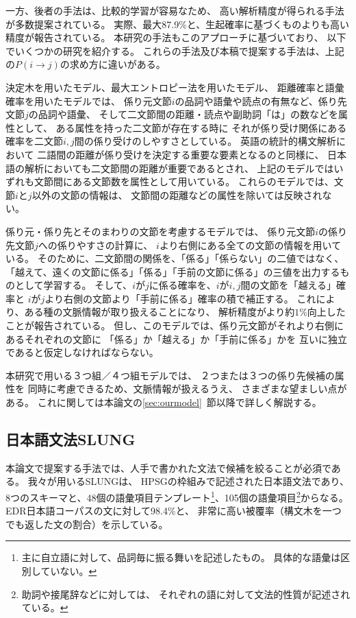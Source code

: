一方、後者の手法は、比較的学習が容易なため、
高い解析精度が得られる手法が多数提案されている。
実際、最大87.9$\%$と、生起確率に基づくものよりも高い精度が報告されている\cite{Uchimoto99b}。
本研究の手法もこのアプローチに基づいており、
以下でいくつかの研究を紹介する。
これらの手法及び本稿で提案する手法は、上記の$P(i \rightarrow j)$の求め方に違いがある。


決定木を用いたモデル\cite{Haruno98}、最大エントロピー法を用いたモデル\cite{Uchimoto99}、
距離確率と語彙確率を用いたモデル\cite{Fujio99}では、
係り元文節$i$の品詞や語彙や読点の有無など、係り先文節$j$の品詞や語彙、
そして二文節間の距離・読点や副助詞「は」の数などを属性として、
ある属性を持った二文節が存在する時に
それが係り受け関係にある確率を二文節$i, j$間の係り受けのしやすさとしている。
英語の統計的構文解析において
二語間の距離が係り受けを決定する重要な要素となる\cite{Collins96}のと同様に、
日本語の解析においても二文節間の距離が重要であるとされ、
上記のモデルではいずれも文節間にある文節数を属性として用いている。
これらのモデルでは、文節$i$と$j$以外の文節の情報は、
文節間の距離などの属性を除いては反映されない。


係り元・係り先とそのまわりの文節を考慮するモデル\cite{Uchimoto99b}では、
係り元文節$i$の係り先文節$j$への係りやすさの計算に、
$i$より右側にある全ての文節の情報を用いている。
そのために、二文節間の関係を、「係る」「係らない」の二値ではなく、
「越えて、遠くの文節に係る」「係る」「手前の文節に係る」の三値を出力するものとして学習する。
そして、$i$が$j$に係る確率を、$i$が$i, j$間の文節を「越える」確率と
$i$が$j$より右側の文節より「手前に係る」確率の積で補正する。
これにより、ある種の文脈情報が取り扱えることになり、
解析精度が\cite{Uchimoto99}より約$1\%$向上したことが報告されている。
但し、このモデルでは、係り元文節がそれより右側にあるそれぞれの文節に
「係る」か「越える」か「手前に係る」かを
互いに独立であると仮定しなければならない。


本研究で用いる３つ組／４つ組モデル\cite{Kanayama99}では、
２つまたは３つの係り先候補の属性を
同時に考慮できるため、文脈情報が扱えるうえ、
さまざまな望ましい点がある。
これに関しては本論文の\ref{sec:ourmodel}~節以降で詳しく解説する。


\subsection{日本語文法SLUNG}\label{subsec:slung}

本論文で提案する手法では、人手で書かれた文法で候補を絞ることが必須である。
我々が用いるSLUNG\cite{Mitsuishi98}は、
HPSG\cite{PollardSag94}の枠組みで記述された日本語文法であり、
8つのスキーマと、48個の語彙項目テンプレート\footnote{主に自立語に対して、品詞毎に振る舞いを記述したもの。
具体的な語彙は区別していない。}、105個の語彙項目\footnote{助詞や接尾辞などに対しては、
それぞれの語に対して文法的性質が記述されている。}からなる。
EDR日本語コーパス\cite{EDR}の文に対して98.4$\%$と、
非常に高い被覆率（構文木を一つでも返した文の割合）を示している。

